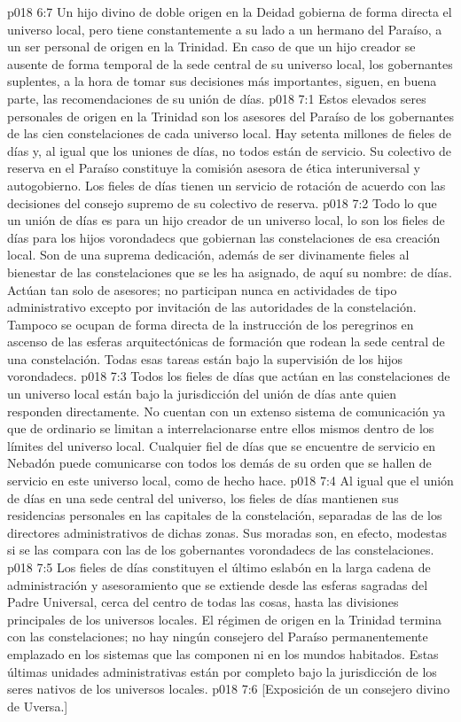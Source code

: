 \vs p018 6:7 Un hijo divino de doble origen en la Deidad gobierna de forma directa el universo local, pero tiene constantemente a su lado a un hermano del Paraíso, a un ser personal de origen en la Trinidad. En caso de que un hijo creador se ausente de forma temporal de la sede central de su universo local, los gobernantes suplentes, a la hora de tomar sus decisiones más importantes, siguen, en buena parte, las recomendaciones de su unión de días.
\vs p018 7:1 Estos elevados seres personales de origen en la Trinidad son los asesores del Paraíso de los gobernantes de las cien constelaciones de cada universo local. Hay setenta millones de fieles de días y, al igual que los uniones de días, no todos están de servicio. Su colectivo de reserva en el Paraíso constituye la comisión asesora de ética interuniversal y autogobierno. Los fieles de días tienen un servicio de rotación de acuerdo con las decisiones del consejo supremo de su colectivo de reserva.
\vs p018 7:2 Todo lo que un unión de días es para un hijo creador de un universo local, lo son los fieles de días para los hijos vorondadecs que gobiernan las constelaciones de esa creación local. Son de una suprema dedicación, además de ser divinamente fieles al bienestar de las constelaciones que se les ha asignado, de aquí su nombre:  de días. Actúan tan solo de asesores; no participan nunca en actividades de tipo administrativo excepto por invitación de las autoridades de la constelación. Tampoco se ocupan de forma directa de la instrucción de los peregrinos en ascenso de las esferas arquitectónicas de formación que rodean la sede central de una constelación. Todas esas tareas están bajo la supervisión de los hijos vorondadecs.
\vs p018 7:3 Todos los fieles de días que actúan en las constelaciones de un universo local están bajo la jurisdicción del unión de días ante quien responden directamente. No cuentan con un extenso sistema de comunicación ya que de ordinario se limitan a interrelacionarse entre ellos mismos dentro de los límites del universo local. Cualquier fiel de días que se encuentre de servicio en Nebadón puede comunicarse con todos los demás de su orden que se hallen de servicio en este universo local, como de hecho hace.
\vs p018 7:4 Al igual que el unión de días en una sede central del universo, los fieles de días mantienen sus residencias personales en las capitales de la constelación, separadas de las de los directores administrativos de dichas zonas. Sus moradas son, en efecto, modestas si se las compara con las de los gobernantes vorondadecs de las constelaciones.
\vs p018 7:5 Los fieles de días constituyen el último eslabón en la larga cadena de administración y asesoramiento que se extiende desde las esferas sagradas del Padre Universal, cerca del centro de todas las cosas, hasta las divisiones principales de los universos locales. El régimen de origen en la Trinidad termina con las constelaciones; no hay ningún consejero del Paraíso permanentemente emplazado en los sistemas que las componen ni en los mundos habitados. Estas últimas unidades administrativas están por completo bajo la jurisdicción de los seres nativos de los universos locales.
\vsetoff
\vs p018 7:6 [Exposición de un consejero divino de Uversa.]
